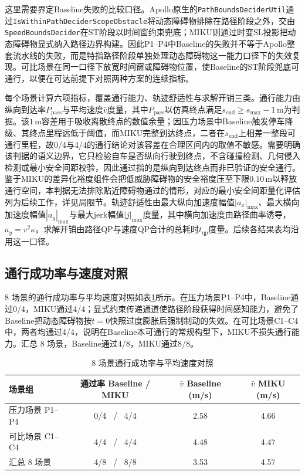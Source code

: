 \documentclass[a4paper,11pt]{ctexart}
\theoremstyle{definition}
\begin{document}
这里需要界定Baseline失败的比较口径。Apollo原生的\texttt{PathBoundsDeciderUtil}通过\texttt{IsWithinPathDeciderScopeObstacle}将动态障碍物排除在路径阶段之外，交由\texttt{SpeedBoundsDecider}在ST阶段以时间窗约束兜底；MIKU则通过时变SL投影把动态障碍物显式纳入路径边界构建。因此P1--P4中Baseline的失败并不等于Apollo整套流水线的失败，而是特指路径阶段单独处理动态障碍物这一能力口径下的失效复现。可比场景在同一口径下放宽时间窗或障碍物位置，使Baseline的ST阶段兜底可通行，以便在可达前提下对照两种方案的连续指标。

每个场景计算六项指标，覆盖通行能力、轨迹舒适性与求解开销三类。通行能力由纵向到达率$P_{\mathrm{pass}}$与平均速度$\bar v$度量，其中$P_{\mathrm{pass}}$以仿真终点满足$s_{\mathrm{end}} \geq s_{\max} - 1$\,m为判据。该$1$\,m容差用于吸收离散终点的数值余量；因压力场景中Baseline触发停车降级、其终点里程远低于阈值，而MIKU完整到达终点，二者在$s_{\mathrm{end}}$上相差一整段可通行里程，故0/4与4/4的通行结论对该容差在合理区间内的取值不敏感。需要明确该判据的语义边界，它只检验自车是否纵向行驶到终点，不含碰撞检测、几何侵入检测或最小安全间距校验，因此通过指的是纵向到达终点而非已验证的安全通行。鉴于MIKU的差异化裕度组件会把低威胁障碍物的安全裕度压至下限$0.10$\,m以释放通行空间，本判据无法排除贴近障碍物通过的情形，对应的最小安全间距量化评估列为后续工作，详见局限节。轨迹舒适性由最大纵向加速度幅值$|a_x|_{\max}$、最大横向加速度幅值$|a_y|_{\max}$与最大jerk幅值$|j|_{\max}$度量，其中横向加速度由路径曲率诱导，$a_y = v^2 \kappa$。求解开销由路径QP与速度QP合计的总耗时$t_{\mathrm{qp}}$度量。后续各结果表均沿用这一口径。

\subsection{通行成功率与速度对照}
\label{subsec:exp_passrate}

8 场景的通行成功率与平均速度对照如表\ref{tab:exp_pass}所示。在压力场景P1--P4中，Baseline通过0/4，MIKU通过4/4；显式约束传递通道使路径阶段获得时间感知能力，避免了Baseline把动态障碍物按$t=0$快照过度膨胀后强制制动的失效。在可比场景C1--C4中，两者均通过4/4，说明在Baseline本可通行的常规构型下，MIKU不损失通行能力。汇总 8 场景，Baseline通过4/8，MIKU通过8/8。

\begin{table}[htbp]
\centering
\caption{8 场景通行成功率与平均速度对照}
\label{tab:exp_pass}
\small
\begin{tabular}{lccc}
\toprule
\textbf{场景组} & \textbf{通过率 Baseline / MIKU} & \textbf{$\bar v$ Baseline (m/s)} & \textbf{$\bar v$ MIKU (m/s)} \\
\midrule
压力场景 P1--P4 & 0/4 \ / \ 4/4 & 2.58 & 4.66 \\
可比场景 C1--C4 & 4/4 \ / \ 4/4 & 4.48 & 4.47 \\
\midrule
汇总 8 场景 & 4/8 \ / \ 8/8 & 3.53 & 4.57 \\
\bottomrule
\end{tabular}
\end{table}
\end{document}
